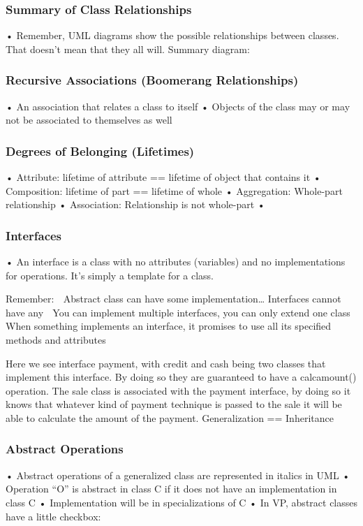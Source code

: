 \documentclass[11pt]{article}
\begin{document}
{\subsubsection{Summary of Class Relationships}
• Remember, UML diagrams show the possible relationships between classes. That doesn't mean that
they all will.
Summary diagram:
\subsubsection{Recursive Associations (Boomerang Relationships)}
• An association that relates a class to itself
• Objects of the class may or may not be associated to themselves as well
\subsubsection{Degrees of Belonging (Lifetimes)}
• Attribute: lifetime of attribute == lifetime of object that contains it
• Composition: lifetime of part == lifetime of whole
• Aggregation: Whole-part relationship
• Association: Relationship is not whole-part
•
\subsubsection{Interfaces}
• An interface is a class with no attributes (variables) and no implementations for operations. It's
simply a template for a class.

Remember:
 Abstract class can have some implementation… Interfaces cannot have any
 You can implement multiple interfaces, you can only extend one class
 When something implements an interface, it promises to use all its specified methods and attributes

Here we see interface payment, with credit and cash being two classes that implement this interface. By
doing so they are guaranteed to have a calcamount() operation.
The sale class is associated with the payment interface, by doing so it knows that whatever kind of payment
technique is passed to the sale it will be able to calculate the amount of the payment.
Generalization == Inheritance
\subsubsection{Abstract Operations}
• Abstract operations of a generalized class are represented in italics in UML
• Operation “O” is abstract in class C if it does not have an implementation in class C
• Implementation will be in specializations of C
• In VP, abstract classes have a little checkbox: 
}
\end{document}
